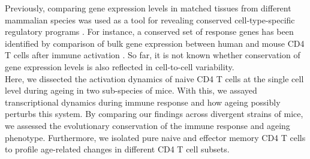 Previously, comparing gene expression levels in matched tissues from different mammalian species was used as a tool for revealing conserved cell-type-specific regulatory programs \citep{Sudmant2015, Finseth2014, Brawand2011, Flajnik2009}. For instance, a conserved set of response genes has been identified by comparison of bulk gene expression between human and mouse CD4\plus{} T cells after immune activation \citep{Shay2013}. So far, it is not known whether conservation of gene expression levels is also reflected in cell-to-cell variability.\\

Here, we dissected the activation dynamics of naive CD4\plus{} T cells at the single cell level during ageing in two sub-species of mice. With this, we assayed transcriptional dynamics during immune response and how ageing possibly perturbs this system. By comparing our findings across divergent strains of mice, we assessed the evolutionary conservation of the immune response and ageing phenotype. Furthermore, we isolated pure naive and effector memory CD4\plus{} T cells to profile age-related changes in different CD4\plus{} T cell subsets.
